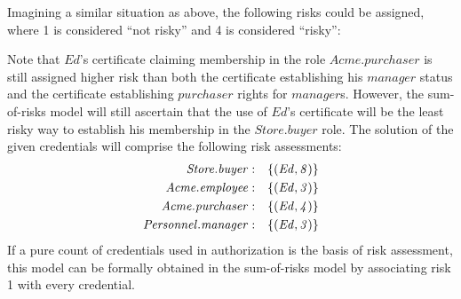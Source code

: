 Imagining a similar situation as above, the following risks could 
be assigned, where 1 is considered ``not risky'' and 4 is considered
``risky'':
\begin{mathpar}




\end{mathpar}
Note that $\mathit{Ed}$'s certificate claiming membership in the role
$\mathit{Acme.purchaser}$ is still assigned higher risk than both
the certificate establishing his $\mathit{manager}$ status and the
certificate establishing $\mathit{purchaser}$ rights for
$\mathit{manager}$s.  However, the sum-of-risks model will still
ascertain that the use of $\mathit{Ed}$'s certificate will be the least
risky way to establish his membership in the $\mathit{Store.buyer}$
role.  The solution of the given credentials will comprise the following
risk assessments:
\begin{eqnarray*}
\mathit{Store.buyer}&:& \setdefn{(\mathit{Ed, 8})}\\
\mathit{Acme.employee}&:& \setdefn{(\mathit{Ed, 3})}\\
\mathit{Acme.purchaser}&:& \setdefn{(\mathit{Ed, 4})}\\
\mathit{Personnel.manager}&:& \setdefn{(\mathit{Ed, 3})}
\end{eqnarray*}
If a pure count of credentials used in authorization is the 
basis of risk assessment, this model can be formally obtained 
in the sum-of-risks model by associating risk 1 with every 
credential.
